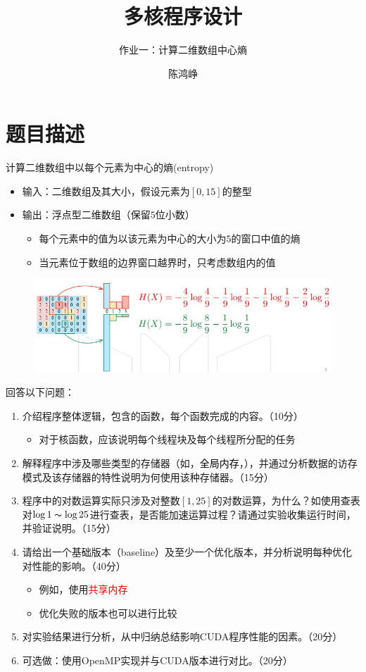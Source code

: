 \documentclass[logo,reportComp]{thesis}
\title{多核程序设计}
\subtitle{作业一：计算二维数组中心熵}
\author{陈鸿峥}
\def\globalmem{\textcolor{black}{\kaiti 全局内存}}
\def\sharedmem{\textcolor{red}{\kaiti 共享内存}}
\begin{document}
\maketitle
\tableofcontents

\newpage

\section{题目描述}
计算二维数组中以每个元素为中心的熵(entropy)
\begin{itemize}
    \item 输入：二维数组及其大小，假设元素为$[0,15]$的整型
    \item 输出：浮点型二维数组（保留$5$位小数）
    \begin{itemize}
        \item 每个元素中的值为以该元素为中心的大小为$5$的窗口中值的熵
        \item 当元素位于数组的边界窗口越界时，只考虑数组内的值
    \end{itemize}
\end{itemize}
\begin{figure}[H]
\centering
\includegraphics[width=0.9\linewidth]{fig/entropy.jpg}
\end{figure}

回答以下问题：
\begin{enumerate}
\item 介绍程序整体逻辑，包含的函数，每个函数完成的内容。（10分）
\begin{itemize}
    \item 对于核函数，应该说明每个线程块及每个线程所分配的任务
\end{itemize}
\item 解释程序中涉及哪些类型的存储器（如，\globalmem，），并通过分析数据的访存模式及该存储器的特性说明为何使用该种存储器。（15分）
\item 程序中的对数运算实际只涉及对整数$[1,25]$的对数运算，为什么？如使用查表对$\log1\thicksim \log25$进行查表，是否能加速运算过程？请通过实验收集运行时间，并验证说明。（15分）
\item 请给出一个基础版本（baseline）及至少一个优化版本，并分析说明每种优化对性能的影响。（40分）
\begin{itemize}
    \item 例如，使用\sharedmem
    \item 优化失败的版本也可以进行比较
\end{itemize}
\item 对实验结果进行分析，从中归纳总结影响CUDA程序性能的因素。（20分）
\item 可选做：使用OpenMP实现并与CUDA版本进行对比。（20分）
\end{enumerate}
\end{document}
